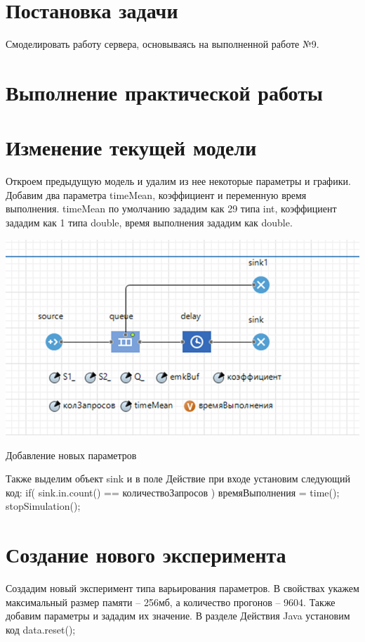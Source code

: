\graphicspath{{./img}} %


\section{Постановка задачи}
Смоделировать работу сервера, основываясь на выполненной работе №9.

\section*{Выполнение практической работы}


\section{Изменение текущей модели}
Откроем предыдущую модель и удалим из нее некоторые параметры и графики.
Добавим два параметра timeMean, коэффициент и переменную время выполнения.
timeMean по умолчанию зададим как 29 типа int, коэффициент зададим как 1 типа double, время выполнения зададим как double.

\begin{image}
	\includegraphics[width=1\textwidth]{img1}
	\caption{Добавление новых параметров}
	\label{fig:model}
\end{image}

Также выделим объект sink и в поле Действие при входе установим следующий код:
if( sink.in.count() == количествоЗапросов ){ времяВыполнения = time(); stopSimulation();}

\clearpage

\section{Создание нового эксперимента}
Создадим новый эксперимент типа варьирования параметров.
В свойствах укажем максимальный размер памяти – 256мб, а количество прогонов – 9604.
Также добавим параметры и зададим их значение. В разделе Действия Java установим код data.reset();

